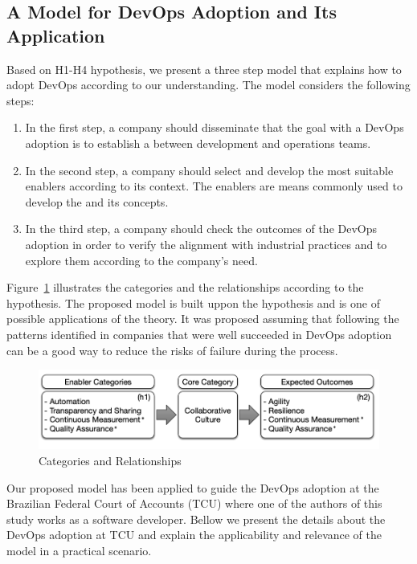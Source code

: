 \subsection{A Model for DevOps Adoption and Its Application}\label{sec:case_study}

Based on H1-H4 hypothesis, we present a three step model that
explains how to adopt DevOps according to our understanding. The
model considers the following steps:

\begin{enumerate}
\item In the first step, a company should
disseminate that the goal with a DevOps adoption is to
establish a \cc between
development and operations teams.

\item In the second step, a company should select and develop
the most suitable enablers according to its context. The enablers
are means commonly used to develop the \cc
and its concepts.

\item In the third step, a company should check the outcomes of the
DevOps adoption in order to verify the alignment with
industrial practices and to explore them according to the company's need.
\end{enumerate}

{
\color{blue}
Figure~\ref{model} illustrates the categories and the
relationships according to the hypothesis. The proposed model is built uppon
the hypothesis and is one of possible applications of the theory. It was proposed
assuming that following the patterns identified in companies that were
well succeeded in DevOps adoption can be a good way to reduce the risks of
failure during the process.
}

\begin{figure}
  \includegraphics[width=\linewidth]{model.png}
  \caption{Categories and Relationships}
  \label{model}
\end{figure}

{
\color{blue}
Our proposed model has been applied to guide the DevOps adoption at the
Brazilian Federal Court of Accounts (TCU) where one of the authors of this study
works as a software developer. Bellow we present the details about the DevOps
adoption at TCU and explain the applicability and relevance of the model in a
practical scenario.
}
